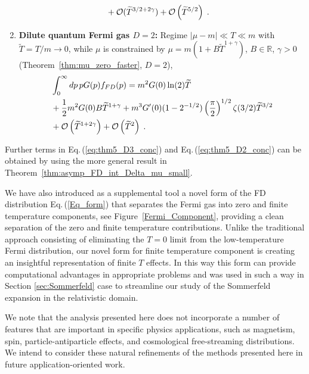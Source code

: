 \documentclass[sn-mathphys,Numbered]{sn-jnl}
\newcommand{\req}[1]{Eq.\,(\ref{#1})}
\newcommand{\rf}[1]{Figure~{\ref{#1}}}
\newcommand{\rTh}[1]{Theorem~{\ref{#1}}}
\begin{document}
\begin{enumerate}
\begin{align}
 &+\mathcal{O}(\widetilde{T}^{3/2+2\gamma})+ \mathcal{O}\left(\widetilde{T}^{5/2}\right)\;. \notag
\end{align} 
\item  
{\bf Dilute quantum Fermi gas $D=2$:} Regime $|\mu-m|\ll T\ll m$ with  $\widetilde{T}=T/m\to 0$, while $\mu$ is constrained by $\mu=m(1+B\widetilde{T}^{1+\gamma})$, $B\in\mathbb{R}$, $\gamma>0$ (\rTh{thm:mu_zero_faster}, $D=2$),
\begin{align}
&\int_0^\infty dp\, p G(p) f_{FD}(p)=m^{2}G(0)\ln(2)\widetilde{T} \label{eq:thm5_D2_conc}\\
 &+\frac{1}{2}m^{2}G(0)B\widetilde{T}^{1+\gamma}+m^{3}G^\prime(0)(1 - 2^{-1/2}) \left(\frac{\pi}{2}\right)^{1/2} \zeta(3/2)\widetilde{T}^{3/2}\notag\\
 &+\mathcal{O}\left(\widetilde{T}^{1+2\gamma}\right)+\mathcal{O}\left(\widetilde{T}^{2}\right)\;.\notag
\end{align} 
\end{enumerate}
Further terms in \req{eq:thm5_D3_conc} and \req{eq:thm5_D2_conc} can be obtained by using the more general result in  \rTh{thm:asymp_FD_int_Delta_mu_small}.

We have also introduced as a supplemental tool a novel form of the FD distribution \req{Eq_form} that separates the Fermi gas into zero and finite temperature components, see \rf{Fermi_Component}, providing a clean separation of the zero and finite temperature contributions. Unlike the traditional  approach consisting of eliminating the $T=0$ limit from the low-temperature Fermi distribution, our novel form  for finite temperature component  is creating an insightful representation of finite $T$ effects. In this way this form can provide  computational advantages in appropriate problems and was used in such a way in Section \ref{sec:Sommerfeld}  case to streamline  our study of the  Sommerfeld expansion in the relativistic domain.  %

We note that the analysis presented here does not incorporate a number of features that are important in specific physics applications, such as magnetism, spin, particle-antiparticle effects, and cosmological free-streaming distributions.   We intend to consider these natural refinements of the methods presented here in future application-oriented work.
 
\end{document}
